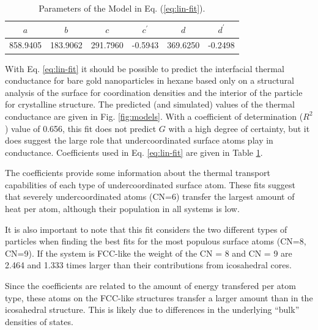 \begin{table}
\centering
\caption{Parameters of the Model in Eq. (\ref{eq:lin-fit}).
  \label{tab:coeff to fit}}
\begin{tabular}{ cccccc }
\toprule
 $a$ & $b$ & $c$ & $c^{\prime}$ & $d$ & $d^{\prime}$ \\
\midrule
 858.9405 & 183.9062 & 291.7960 & -0.5943 & 369.6250 & -0.2498 \\
\bottomrule
\end{tabular}
\end{table}

With Eq. \eqref{eq:lin-fit} it should be possible to predict the
interfacial thermal conductance for bare gold nanoparticles in hexane
based only on a structural analysis of the surface for coordination
densities and the interior of the particle for crystalline structure.
The predicted (and simulated) values of the thermal conductance are
given in Fig. \ref{fig:models}.  With a coefficient of determination
($R^2$) value of 0.656, this fit does not predict $G$ with a high
degree of certainty, but it does suggest the large role that
undercoordinated surface atoms play in conductance. Coefficients used
in Eq. \eqref{eq:lin-fit} are given in Table \ref{tab:coeff to fit}.

The coefficients provide some information about the thermal transport
capabilities of each type of undercoordinated surface atom. These fits
suggest that severely undercoordinated atoms (CN=6) transfer the
largest amount of heat per atom, although their population in all
systems is low.

It is also important to note that this fit considers the two different
types of particles when finding the best fits for the most populous
surface atoms (CN=8, CN=9).  If the system is FCC-like the weight of
the CN = 8 and CN = 9 are 2.464 and 1.333 times larger than their
contributions from icosahedral cores.

Since the coefficients are related to the amount of energy transfered
per atom type, these atoms on the FCC-like structures transfer a
larger amount than in the icosahedral structure.  This is likely due
to differences in the underlying ``bulk'' densities of states.

